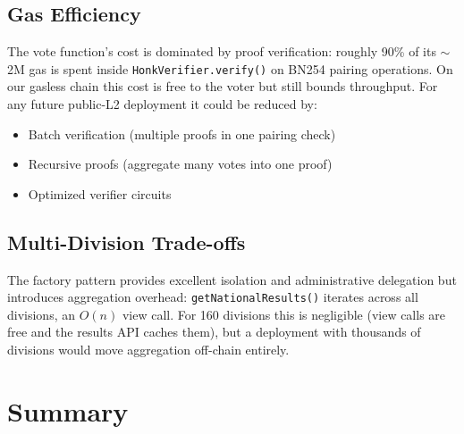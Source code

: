 \subsection{Gas Efficiency}

The vote function's cost is dominated by proof verification: roughly 90\% of its $\sim$2M gas is spent inside \texttt{HonkVerifier.verify()} on BN254 pairing operations. On our gasless chain this cost is free to the voter but still bounds throughput. For any future public-L2 deployment it could be reduced by:
\begin{itemize}
    \item Batch verification (multiple proofs in one pairing check)
    \item Recursive proofs (aggregate many votes into one proof)
    \item Optimized verifier circuits
\end{itemize}

\subsection{Multi-Division Trade-offs}

The factory pattern provides excellent isolation and administrative delegation but introduces aggregation overhead: \texttt{getNationalResults()} iterates across all divisions, an $O(n)$ view call. For 160 divisions this is negligible (view calls are free and the results API caches them), but a deployment with thousands of divisions would move aggregation off-chain entirely.

\section{Summary}

